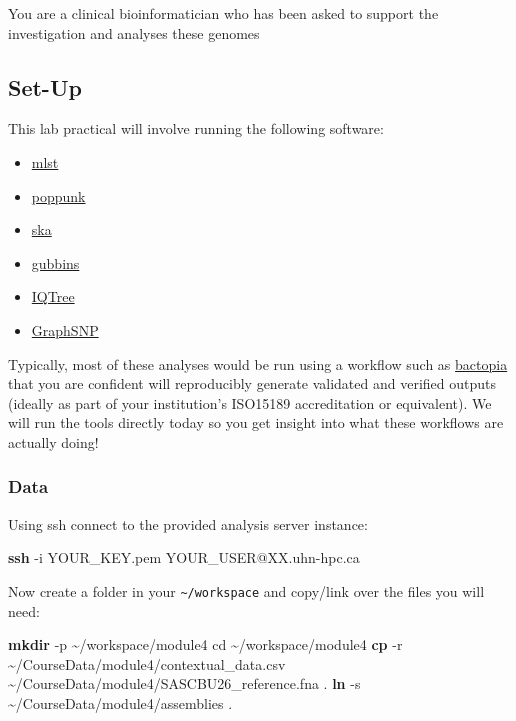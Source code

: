\documentclass[
]{book}
\newenvironment{Shaded}{\begin{snugshade}}{\end{snugshade}}
\newcommand{\AttributeTok}[1]{\textcolor[rgb]{0.13,0.29,0.53}{#1}}
\newcommand{\BuiltInTok}[1]{#1}
\newcommand{\FunctionTok}[1]{\textcolor[rgb]{0.13,0.29,0.53}{\textbf{#1}}}
\newcommand{\NormalTok}[1]{#1}
\providecommand{\tightlist}{%
  \setlength{\itemsep}{0pt}\setlength{\parskip}{0pt}}
\begin{document}
You are a clinical bioinformatician who has been asked to support the investigation and analyses these genomes

\subsection{Set-Up}\label{setup1}

This lab practical will involve running the following software:

\begin{itemize}
\tightlist
\item
  \href{https://github.com/tseemann/mlst}{mlst}
\item
  \href{https://github.com/bacpop/PopPUNK}{poppunk}
\item
  \href{https://github.com/bacpop/ska.rust}{ska}
\item
  \href{https://github.com/nickjcroucher/gubbins}{gubbins}
\item
  \href{https://github.com/iqtree/iqtree3}{IQTree}
\item
  \href{https://graphsnp.fordelab.com/}{GraphSNP}
\end{itemize}

Typically, most of these analyses would be run using a workflow such as \href{https://bactopia.github.io/latest/}{bactopia} that you are confident will reproducibly generate validated and verified outputs (ideally as part of your institution's ISO15189 accreditation or equivalent). We will run the tools directly today so you get insight into what these workflows are actually doing!

\subsubsection{Data}\label{data}

Using ssh connect to the provided analysis server instance:

\begin{Shaded}
\begin{Highlighting}[]
\FunctionTok{ssh} \AttributeTok{{-}i}\NormalTok{ YOUR\_KEY.pem YOUR\_USER@XX.uhn{-}hpc.ca}
\end{Highlighting}
\end{Shaded}

Now create a folder in your \texttt{\textasciitilde{}/workspace} and copy/link over the files you will need:

\begin{Shaded}
\begin{Highlighting}[]
\FunctionTok{mkdir} \AttributeTok{{-}p}\NormalTok{ \textasciitilde{}/workspace/module4}
\BuiltInTok{cd}\NormalTok{ \textasciitilde{}/workspace/module4}
\FunctionTok{cp} \AttributeTok{{-}r}\NormalTok{ \textasciitilde{}/CourseData/module4/contextual\_data.csv  \textasciitilde{}/CourseData/module4/SASCBU26\_reference.fna .}
\FunctionTok{ln} \AttributeTok{{-}s}\NormalTok{ \textasciitilde{}/CourseData/module4/assemblies .}
\end{Highlighting}
\end{Shaded}
\end{document}
